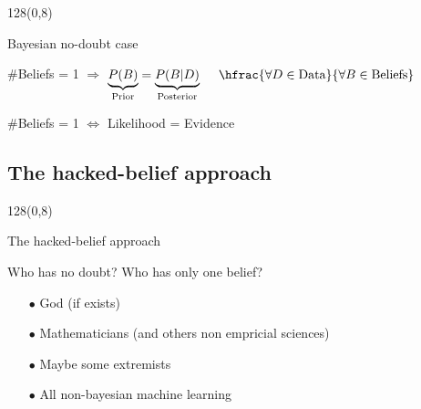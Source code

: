 \documentclass[shownotes]{beamer}
\begin{document}
\begin{frame}
 \begin{textblock}{128}(0,8)
\begin{center}
 \Large Bayesian no-doubt case
\end{center}
\end{textblock}
\vspace{0.5cm}


 \begin{mdframed}[backgroundcolor=black!15]
 \centering
 $\#$Beliefs = 1 $\Longrightarrow$ $\underbrace{P(B)}_{\text{\scriptsize Prior}} = \underbrace{P(B|D)}_{\text{\scriptsize Posterior}} \ \ \ \ \hfrac{\forall D \in \text{Data}}{\forall B \in \text{Beliefs}}$
\end{mdframed}

 \vspace{0.9cm}
\pause 


\begin{mdframed}[backgroundcolor=black!15]
\centering
 $\#$Beliefs = 1  $\Longleftrightarrow$ Likelihood = Evidence  
\end{mdframed}
 

 

\end{frame}



\subsection{The hacked-belief approach}

\begin{frame}
 \begin{textblock}{128}(0,8)
\begin{center}
 \large The hacked-belief approach
\end{center}
\end{textblock}
\vspace{0.5cm}


\begin{center}
 
 \begin{mdframed}
 \centering
  Who has no doubt? Who has only one belief?
 \end{mdframed}
 
 \vspace{0.3cm}
 \pause
 
 \begin{itemize}
  \item[$\bullet$] God (if exists) \pause
  \item[$\bullet$] Mathematicians (and others non empricial sciences) \pause
  \item[$\bullet$] Maybe some extremists \pause
  \item[$\bullet$] \huge All non-bayesian machine learning
 \end{itemize}

 
 
 
\end{center}

 
\end{frame}
\end{document}
